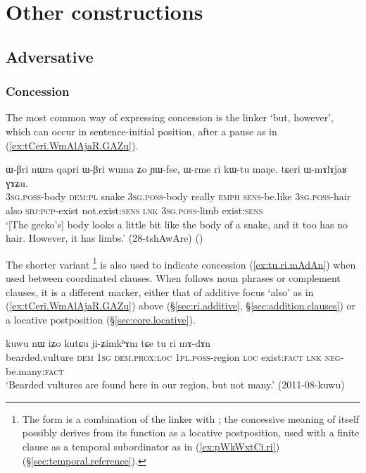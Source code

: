 \section{Other constructions}
 
\subsection{Adversative} \label{sec:adversative.clauses}

\subsubsection{Concession} \label{sec:concessive.clauses}
The most common way of expressing concession is the linker  `but, however', which can occur in sentence-initial position, after a pause as in (\ref{ex:tCeri.WmAlAjaR.GAZu}).

\begin{exe}
\ex \label{ex:tCeri.WmAlAjaR.GAZu}
\gll ɯ-βri nɯra qapri ɯ-βri wuma ʑo ɲɯ-fse, ɯ-rme ri kɯ-tu maŋe. tɕeri ɯ-mɤlɤjaʁ ɣɤʑu. \\
\textsc{3sg}.\textsc{poss}-body \textsc{dem}:\textsc{pl} snake \textsc{3sg}.\textsc{poss}-body really \textsc{emph} \textsc{sens}-be.like \textsc{3sg}.\textsc{poss}-hair also \textsc{sbj}:\textsc{pcp}-exist not.exist:\textsc{sens} \textsc{lnk} \textsc{3sg}.\textsc{poss}-limb exist:\textsc{sens} \\
\glt `[The gecko's] body looks a little bit like the body of a snake, and it too has no hair. However, it has limbs.' (28-tshAwAre)
()
\end{exe}  

The shorter variant \footnote{The form  is a combination of the linker  with ; the concessive meaning of  itself possibly derives from its function as a locative postposition, used with a finite clause as a temporal subordinator as in (\ref{ex:pWkWxtCi.ri}) (§\ref{sec:temporal.reference}). } is also used to indicate concession (\ref{ex:tu.ri.mAdAn}) when used between coordinated clauses. When  follows noun phrases or complement clauses, it is a different marker, either that of additive focus `also' as in (\ref{ex:tCeri.WmAlAjaR.GAZu}) above (§\ref{sec:ri.additive}, §\ref{sec:addition.clauses}) or a locative postposition (§\ref{sec:core.locative}).

\begin{exe}
\ex \label{ex:tu.ri.mAdAn}
\gll kuwu nɯ iʑo kutɕu ji-ʑimkʰɤm tɕe tu ri mɤ-dɤn \\
bearded.vulture \textsc{dem} \textsc{1sg} \textsc{dem}.\textsc{prox}:\textsc{loc} \textsc{1pl}.\textsc{poss}-region \textsc{loc} exist:\textsc{fact} \textsc{lnk} \textsc{neg}-be.many:\textsc{fact} \\
\glt `Bearded vultures are found here in our region, but not many.' (2011-08-kuwu)
\end{exe}  
 
